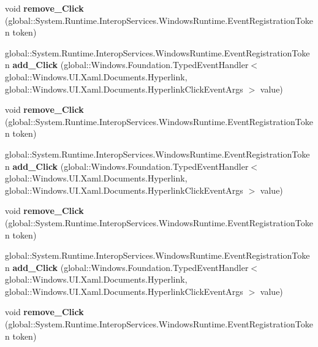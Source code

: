 \begin{DoxyCompactItemize}
void {\bfseries remove\+\_\+\+Click} (global\+::\+System.\+Runtime.\+Interop\+Services.\+Windows\+Runtime.\+Event\+Registration\+Token token)
\item 
\mbox{\label{interface_windows_1_1_u_i_1_1_xaml_1_1_documents_1_1_i_hyperlink_a8c7876ee55723e6e4fc0c3a7d0426de1}} 
global\+::\+System.\+Runtime.\+Interop\+Services.\+Windows\+Runtime.\+Event\+Registration\+Token {\bfseries add\+\_\+\+Click} (global\+::\+Windows.\+Foundation.\+Typed\+Event\+Handler$<$ global\+::\+Windows.\+U\+I.\+Xaml.\+Documents.\+Hyperlink, global\+::\+Windows.\+U\+I.\+Xaml.\+Documents.\+Hyperlink\+Click\+Event\+Args $>$ value)
\item 
\mbox{\label{interface_windows_1_1_u_i_1_1_xaml_1_1_documents_1_1_i_hyperlink_afd983db4770a373b17838ad79c3ffb1a}} 
void {\bfseries remove\+\_\+\+Click} (global\+::\+System.\+Runtime.\+Interop\+Services.\+Windows\+Runtime.\+Event\+Registration\+Token token)
\item 
\mbox{\label{interface_windows_1_1_u_i_1_1_xaml_1_1_documents_1_1_i_hyperlink_a8c7876ee55723e6e4fc0c3a7d0426de1}} 
global\+::\+System.\+Runtime.\+Interop\+Services.\+Windows\+Runtime.\+Event\+Registration\+Token {\bfseries add\+\_\+\+Click} (global\+::\+Windows.\+Foundation.\+Typed\+Event\+Handler$<$ global\+::\+Windows.\+U\+I.\+Xaml.\+Documents.\+Hyperlink, global\+::\+Windows.\+U\+I.\+Xaml.\+Documents.\+Hyperlink\+Click\+Event\+Args $>$ value)
\item 
\mbox{\label{interface_windows_1_1_u_i_1_1_xaml_1_1_documents_1_1_i_hyperlink_afd983db4770a373b17838ad79c3ffb1a}} 
void {\bfseries remove\+\_\+\+Click} (global\+::\+System.\+Runtime.\+Interop\+Services.\+Windows\+Runtime.\+Event\+Registration\+Token token)
\item 
\mbox{\label{interface_windows_1_1_u_i_1_1_xaml_1_1_documents_1_1_i_hyperlink_a8c7876ee55723e6e4fc0c3a7d0426de1}} 
global\+::\+System.\+Runtime.\+Interop\+Services.\+Windows\+Runtime.\+Event\+Registration\+Token {\bfseries add\+\_\+\+Click} (global\+::\+Windows.\+Foundation.\+Typed\+Event\+Handler$<$ global\+::\+Windows.\+U\+I.\+Xaml.\+Documents.\+Hyperlink, global\+::\+Windows.\+U\+I.\+Xaml.\+Documents.\+Hyperlink\+Click\+Event\+Args $>$ value)
\item 
\mbox{\label{interface_windows_1_1_u_i_1_1_xaml_1_1_documents_1_1_i_hyperlink_afd983db4770a373b17838ad79c3ffb1a}} 
void {\bfseries remove\+\_\+\+Click} (global\+::\+System.\+Runtime.\+Interop\+Services.\+Windows\+Runtime.\+Event\+Registration\+Token token)
\end{DoxyCompactItemize}


